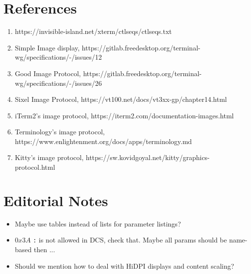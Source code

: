 \documentclass{article}
\newcommand{\code}[1]{\colorbox{light-gray}{\texttt{#1}}}
\begin{document}
\section{References} %

\begin{enumerate}
    \item \label{ref:ctlseqs}https://invisible-island.net/xterm/ctlseqs/ctlseqs.txt
    \item \label{ref:twg-simple-image-display}Simple Image display, https://gitlab.freedesktop.org/terminal-wg/specifications/-/issues/12
    \item \label{ref:twg-gip}Good Image Protocol, https://gitlab.freedesktop.org/terminal-wg/specifications/-/issues/26
    \item \label{ref:image-sixel}Sixel Image Protocol, https://vt100.net/docs/vt3xx-gp/chapter14.html
    \item \label{ref:image-item2}iTerm2's image protocol, https://iterm2.com/documentation-images.html
    \item \label{ref:image-terminology}Terminology's image protocol, https://www.enlightenment.org/docs/apps/terminology.md 
    \item \label{ref:image-kitty}Kitty's image protocol, https://sw.kovidgoyal.net/kitty/graphics-protocol.html
\end{enumerate}

\section{Editorial Notes}

\begin{itemize}
    \item Maybe use tables instead of lists for parameter listings?
    \item $0x3A$ \code{:} is not allowed in DCS, check that. Maybe all params should be name-based then ...
    \item Should we mention how to deal with HiDPI displays and content scaling?
\end{itemize}

\listoftodos
\end{document}
